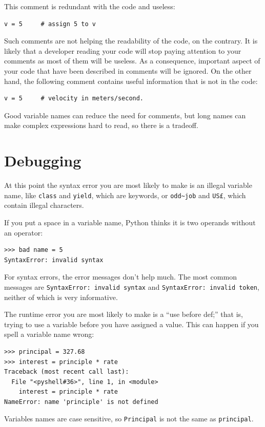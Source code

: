 This comment is redundant with the code and useless:

\beforeverb
\begin{verbatim}
v = 5     # assign 5 to v
\end{verbatim}
\afterverb
%
Such comments are not helping the readability of the code, on the contrary. It is likely that a developer reading your code will stop paying attention to your comments as most of them will be useless. As a consequence, important aspect of your code that have been described in comments will be ignored. On the other hand, the following comment contains useful information that is not in the code:

\beforeverb
\begin{verbatim}
v = 5     # velocity in meters/second. 
\end{verbatim}
\afterverb
%
Good variable names can reduce the need for comments, but
long names can make complex expressions hard to read, so there is
a tradeoff.

\section{Debugging}

At this point the syntax error you are most likely to make is
an illegal variable name, like {\tt class} and {\tt yield}, which
are keywords, or \verb"odd~job" and \verb"US£", which contain
illegal characters.


If you put a space in a variable name, Python thinks it is two
operands without an operator:

\beforeverb
\begin{verbatim}
>>> bad name = 5
SyntaxError: invalid syntax
\end{verbatim}
\afterverb
%
For syntax errors, the error messages don't help much.
The most common messages are {\tt SyntaxError: invalid syntax} and
{\tt SyntaxError: invalid token}, neither of which is very informative.


The runtime error you are most likely to make is a ``use before
def;'' that is, trying to use a variable before you have assigned
a value.  This can happen if you spell a variable name wrong:

\beforeverb
\begin{verbatim}
>>> principal = 327.68
>>> interest = principle * rate
Traceback (most recent call last):
  File "<pyshell#36>", line 1, in <module>
    interest = principle * rate
NameError: name 'principle' is not defined
\end{verbatim}
\afterverb
%
Variables names are case sensitive, so {\tt Principal} is not the
same as {\tt principal}.

